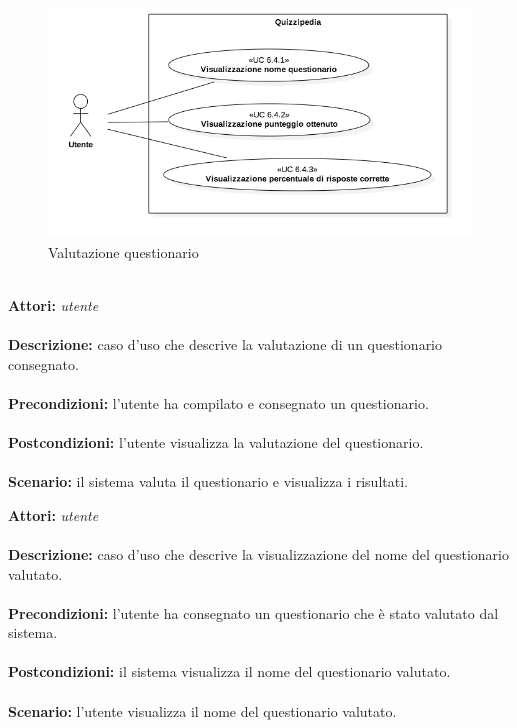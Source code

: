 \documentclass[a4paper,11pt]{article}
\begin{document}
\begin{figure}[h!]
\centering
\includegraphics[scale=0.6]{../immagini/UC6_5.png}
\caption{Valutazione questionario}
\end{figure}
\ \\
\textbf{Attori:} \textit{utente}
\\ \\
\textbf{Descrizione:} caso d'uso che descrive la valutazione di un questionario consegnato.\\
\\
\textbf{Precondizioni:} l'utente ha compilato e consegnato un questionario.\\
\\
\textbf{Postcondizioni:} l'utente visualizza la valutazione del questionario.\\
\\
\textbf{Scenario:} il sistema valuta il questionario e visualizza i risultati.\\



\textbf{Attori:} \textit{utente}
\\ \\
\textbf{Descrizione:} caso d'uso che descrive la visualizzazione del nome del questionario valutato.\\
\\
\textbf{Precondizioni:} l'utente ha consegnato un questionario che è stato valutato dal sistema.\\
\\
\textbf{Postcondizioni:} il sistema visualizza il nome del questionario valutato.\\
\\
\textbf{Scenario:} l’utente visualizza il nome del questionario valutato.\\
\end{document}
